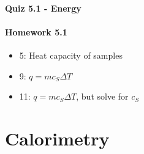 \documentclass[12pt, openany, letterpaper]{memoir}
\begin{document}
\paragraph*{Quiz 5.1 - Energy}
\paragraph*{Homework 5.1}
\begin{itemize}
  \item 5: Heat capacity of samples
  \item 9: $q=mc_S\Delta T$
  \item 11: $q=mc_S\Delta T$, but solve for $c_S$
\end{itemize}

\section{Calorimetry}
\end{document}
